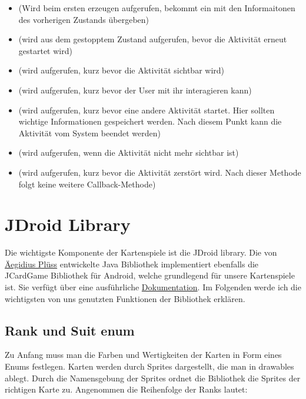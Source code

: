 \begin{itemize}
	\item {} (Wird beim ersten erzeugen aufgerufen, bekommt ein  mit den Informaitonen des vorherigen Zustands übergeben)
	\item {} (wird aus dem gestopptem Zustand aufgerufen, bevor die Aktivität erneut gestartet wird)
	\item {} (wird aufgerufen, kurz bevor die Aktivität sichtbar wird)
	\item {} (wird aufgerufen, kurz bevor der User mit ihr interagieren kann)
	\item {} (wird aufgerufen, kurz bevor eine andere Aktivität startet. Hier sollten wichtige Informationen gespeichert werden. Nach diesem Punkt kann die Aktivität vom System beendet werden)
	\item {} (wird aufgerufen, wenn die Aktivität nicht mehr sichtbar ist)
	\item {} (wird aufgerufen, kurz bevor die Aktivität zerstört wird. Nach dieser Methode folgt keine weitere Callback-Methode)
\end{itemize}
\section{JDroid Library}
\sectionauthor{\philipp}

Die wichtigste Komponente der Kartenspiele ist die JDroid library. Die von
\href{http://www.aplu.ch/home/apluhomex.jsp?site=99}{Äegidius Plüss} entwickelte
Java Bibliothek implementiert ebenfalls die JCardGame Bibliothek für Android,
welche grundlegend für unsere Kartenspiele ist. Sie verfügt über eine
ausführliche
\href{http://www.java-online.ch/gamegrid/index.php?inhalt_links=navigation.inc.php&inhalt_mitte=iframedoc1.html}{Dokumentation}.
Im Folgenden werde ich die wichtigsten von uns genutzten Funktionen der
Bibliothek erklären.

\subsection{Rank und Suit enum}

Zu Anfang muss man die Farben und Wertigkeiten der Karten in Form eines Enums
festlegen. Karten werden durch Sprites dargestellt, die man in drawables ablegt.
Durch die Namensgebung der Sprites ordnet die Bibliothek die Sprites der
richtigen Karte zu. Angenommen die Reihenfolge der Ranks lautet:

